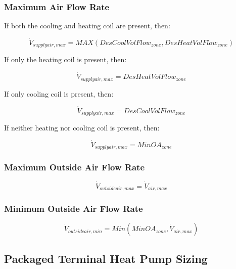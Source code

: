 \subsubsection{Maximum Air Flow Rate}\label{maximum-air-flow-rate-2}

If both the cooling and heating coil are present, then:

\begin{equation}
{\dot V_{supplyair,max}} = MAX\left( {DesCoolVolFlo{w_{zone}},DesHeatVolFlo{w_{zone}}} \right)
\end{equation}

If only the heating coil is present, then:

\begin{equation}
{\dot V_{supplyair,max}} = DesHeatVolFlo{w_{zone}}
\end{equation}

If only cooling coil is present, then:

\begin{equation}
{\dot V_{supplyair,max}} = DesCoolVolFlo{w_{zone}}
\end{equation}

If neither heating nor cooling coil is present, then:

\begin{equation}
{\dot V_{supplyair,max}} = MinO{A_{zone}}
\end{equation}

\subsubsection{Maximum Outside Air Flow Rate}\label{maximum-outside-air-flow-rate-2}

\begin{equation}
{\dot V_{outsideair,max}} = {\dot V_{air,max}}
\end{equation}

\subsubsection{Minimum Outside Air Flow Rate}\label{minimum-outside-air-flow-rate}

\begin{equation}
{\dot V_{outsideair,min}} = Min\left( {MinO{A_{zone}},{{\dot V}_{air,max}}} \right)
\end{equation}

\subsection{Packaged Terminal Heat Pump Sizing}\label{packaged-terminal-heat-pump-sizing}

